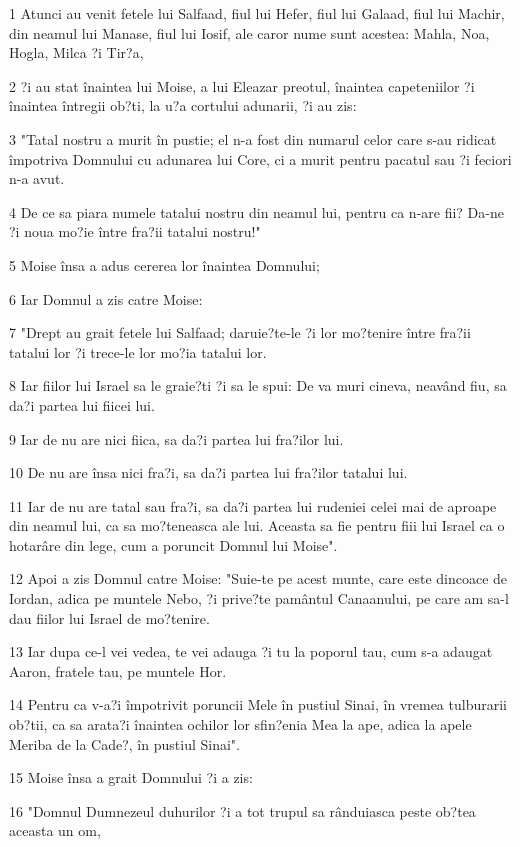 \par 1 Atunci au venit fetele lui Salfaad, fiul lui Hefer, fiul lui Galaad, fiul lui Machir, din neamul lui Manase, fiul lui Iosif, ale caror nume sunt acestea: Mahla, Noa, Hogla, Milca ?i Tir?a,
\par 2 ?i au stat înaintea lui Moise, a lui Eleazar preotul, înaintea capeteniilor ?i înaintea întregii ob?ti, la u?a cortului adunarii, ?i au zis:
\par 3 "Tatal nostru a murit în pustie; el n-a fost din numarul celor care s-au ridicat împotriva Domnului cu adunarea lui Core, ci a murit pentru pacatul sau ?i feciori n-a avut.
\par 4 De ce sa piara numele tatalui nostru din neamul lui, pentru ca n-are fii? Da-ne ?i noua mo?ie între fra?ii tatalui nostru!"
\par 5 Moise însa a adus cererea lor înaintea Domnului;
\par 6 Iar Domnul a zis catre Moise:
\par 7 "Drept au grait fetele lui Salfaad; daruie?te-le ?i lor mo?tenire între fra?ii tatalui lor ?i trece-le lor mo?ia tatalui lor.
\par 8 Iar fiilor lui Israel sa le graie?ti ?i sa le spui: De va muri cineva, neavând fiu, sa da?i partea lui fiicei lui.
\par 9 Iar de nu are nici fiica, sa da?i partea lui fra?ilor lui.
\par 10 De nu are însa nici fra?i, sa da?i partea lui fra?ilor tatalui lui.
\par 11 Iar de nu are tatal sau fra?i, sa da?i partea lui rudeniei celei mai de aproape din neamul lui, ca sa mo?teneasca ale lui. Aceasta sa fie pentru fiii lui Israel ca o hotarâre din lege, cum a poruncit Domnul lui Moise".
\par 12 Apoi a zis Domnul catre Moise: "Suie-te pe acest munte, care este dincoace de Iordan, adica pe muntele Nebo, ?i prive?te pamântul Canaanului, pe care am sa-l dau fiilor lui Israel de mo?tenire.
\par 13 Iar dupa ce-l vei vedea, te vei adauga ?i tu la poporul tau, cum s-a adaugat Aaron, fratele tau, pe muntele Hor.
\par 14 Pentru ca v-a?i împotrivit poruncii Mele în pustiul Sinai, în vremea tulburarii ob?tii, ca sa arata?i înaintea ochilor lor sfin?enia Mea la ape, adica la apele Meriba de la Cade?, în pustiul Sinai".
\par 15 Moise însa a grait Domnului ?i a zis:
\par 16 "Domnul Dumnezeul duhurilor ?i a tot trupul sa rânduiasca peste ob?tea aceasta un om,
